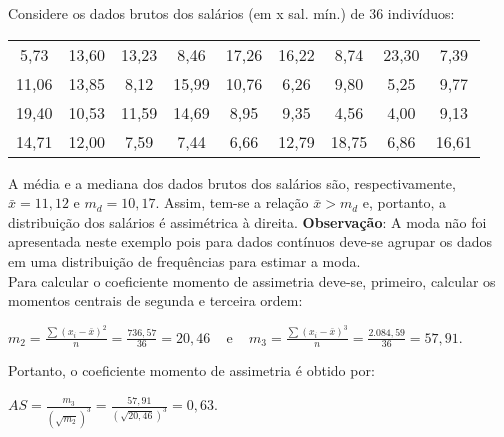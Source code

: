 \documentclass[11pt,fleqn]{book} %
\begin{document}
\begin{example} \label{exemp:assimetria}

	Considere os dados brutos dos salários (em x sal. mín.) de 36 indivíduos:
	
	\begin{center}
	\begin{tabular}{c c c c c c c c c}
	\hline
	5,73  &  13,60  &  13,23  &  8,46  &  17,26  &  16,22  &  8,74  &  23,30  &  7,39 \\
	11,06  &  13,85  &  8,12  &  15,99  &  10,76  &  6,26  &  9,80  &  5,25  &  9,77 \\
	19,40  &  10,53  &  11,59  &  14,69  &  8,95  &  9,35  &  4,56  &  4,00  &  9,13 \\
	14,71  &  12,00  &  7,59  &  7,44  &  6,66  &  12,79  &  18,75  &  6,86  &  16,61 \\
	\hline
	\end{tabular}
	\end{center}
	
	\vspace{0,1cm}
	
	A média e a mediana dos dados brutos dos salários são, respectivamente, $\bar{x}=11,12$  e  $m_d=10,17$. Assim, tem-se a relação $\bar{x}>m_d$ e, portanto, a distribuição dos salários é assimétrica à direita. {\bf Observação}: A moda não foi apresentada neste exemplo pois para dados contínuos deve-se agrupar os dados em uma distribuição de frequências para estimar a moda. \\
	
	Para calcular o coeficiente momento de assimetria deve-se, primeiro, calcular os momentos centrais de segunda e terceira ordem: \\
	
\begin{center}
$\displaystyle m_2=\frac{\sum (x_i-\bar{x})^2}{n}=\frac{736,57}{36}=20,46$ \,\,\, e \,\,\, $\displaystyle m_3=\frac{\sum (x_i-\bar{x})^3}{n}=\frac{2.084,59}{36}=57,91$. \\
\end{center}
	
\vspace{0,2cm}
	
Portanto, o coeficiente momento de assimetria é obtido por: \\

\begin{center}
$\displaystyle AS=\frac{m_3}{(\sqrt{m_2})^3}=\frac{57,91}{(\sqrt{20,46})^3}=0,63$. \\
\end{center}


\end{example}
\end{document}
